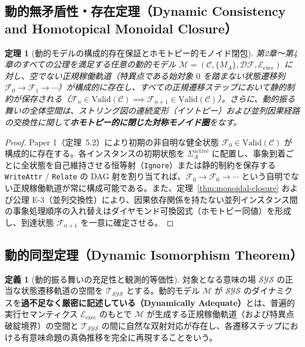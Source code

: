 \documentclass[11pt,a4paper]{ltjsarticle}
\theoremstyle{definition}
\newtheorem{definition}{定義}[section]
\theoremstyle{plain}
\newtheorem{theorem}{定理}[section]
\theoremstyle{remark}
\newcommand{\Valid}{\mathrm{Valid}}
\newcommand{\DF}{\mathcal{DF}}
\begin{document}
\subsection{動的無矛盾性・存在定理（Dynamic Consistency and Homotopical Monoidal Closure）}

\begin{theorem}[動的モデルの構成的存在保証とホモトピー的モノイド閉包]\label{thm:dyn-exist}
第2章〜第4章のすべての公理を満足する任意の動的モデル $\mathcal{M} = (\mathcal{C}, \{M_A\}, \DF, \mathcal{E}_{\mathrm{exec}})$ に対し、空でない正規稼働軌道（特異点である始対象 $0$ を踏まない状態遷移列 $\mathcal{F}_0 \to \mathcal{F}_1 \to \cdots$）が構成的に存在し、すべての正規遷移ステップにおいて静的制約が保存される（$\mathcal{F}_n \in \Valid(\mathcal{C}) \implies \mathcal{F}_{n+1} \in \Valid(\mathcal{C})$）。さらに、動的振る舞いの全体空間は、ストリング図の連続変形（イソトピー）および並列因果経路の交換性に関して\textbf{ホモトピー的に閉じた対称モノイド圏}をなす。
\end{theorem}

\begin{proof}
Paper 1（定理~5.2）により初期の非自明な健全状態 $\mathcal{F}_0 \in \Valid(\mathcal{C})$ が構成的に存在する。各インスタンスの初期状態を $\Sigma_A^{\mathrm{active}}$ に配置し、事象到着ごとに全状態を自己維持させる恒等射（\texttt{Ignore}）または静的制約を保存する \texttt{WriteAttr} / \texttt{Relate} の DAG 射を割り当てれば、$\mathcal{F}_0 \to \mathcal{F}_0 \to \cdots$ という自明でない正規稼働軌道が常に構成可能である。また、定理~\ref{thm:monoidal-closure} および公理 E-3（並列交換性）により、因果依存関係を持たない並列インスタンス間の事象処理順序の入れ替えはダイヤモンド可換図式（ホモトピー同値）を形成し、到達状態 $\mathcal{F}_{n+1}$ を一意に確定させる。
\end{proof}

\subsection{動的同型定理（Dynamic Isomorphism Theorem）}

\begin{definition}[動的振る舞いの充足性と観測的等価性]\label{def:dyn-adeq}
対象となる意味の場 $\mathcal{SYS}$ の正当な状態遷移軌道の空間を $\mathcal{T}_{\mathcal{SYS}}$ とする。動的モデル $\mathcal{M}$ が $\mathcal{SYS}$ のダイナミクスを\textbf{過不足なく厳密に記述している（Dynamically Adequate）}とは、普遍的実行セマンティクス $\mathcal{E}_{\mathrm{exec}}$ のもとで $\mathcal{M}$ が生成する正規稼働軌道（および特異点破綻境界）の空間と $\mathcal{T}_{\mathcal{SYS}}$ の間に自然な双射対応が存在し、各遷移ステップにおける有意味命題の真偽推移を完全に再現することをいう。
\end{definition}
\end{document}
